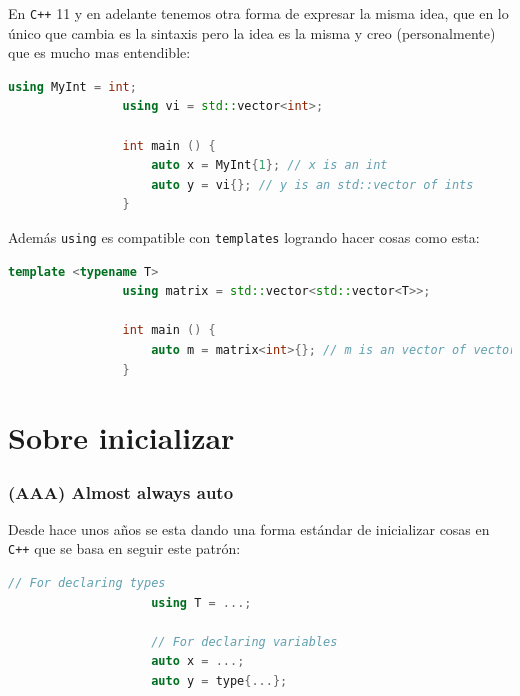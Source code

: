 \documentclass[12pt, fleqn]{report}                             %
\theoremstyle{break}                                            %
\newcommand{\textCode}[1]  { \texttt{#1} }                      %
\newcommand{\Cpp}{\ignorespaces\textCode{C++}}                  %
\begin{document}
            En \Cpp11 y en adelante tenemos otra forma de expresar la misma idea, que en lo único que cambia es
            la sintaxis pero la idea es la misma y creo (personalmente) que es mucho mas entendible:
            \begin{lstlisting}[language=C++, gobble=16]
                using MyInt = int;
                using vi = std::vector<int>;

                int main () {
                    auto x = MyInt{1}; // x is an int
                    auto y = vi{}; // y is an std::vector of ints
                }
            \end{lstlisting}

            Además \textCode{using} es compatible con \textCode{templates} logrando hacer cosas como esta:
            \begin{lstlisting}[language=C++, gobble=16]
                template <typename T> 
                using matrix = std::vector<std::vector<T>>;

                int main () {
                    auto m = matrix<int>{}; // m is an vector of vectors of int
                }
            \end{lstlisting}



        \clearpage
        \section{Sobre inicializar}  

            \subsubsection{(AAA) Almost always auto}

                Desde hace unos años se esta dando una forma estándar de inicializar cosas en \Cpp
                que se basa en seguir este patrón:
                \begin{lstlisting}[language=C++, gobble=20]
                    // For declaring types
                    using T = ...;

                    // For declaring variables
                    auto x = ...;
                    auto y = type{...};
                \end{lstlisting}
\end{document}
